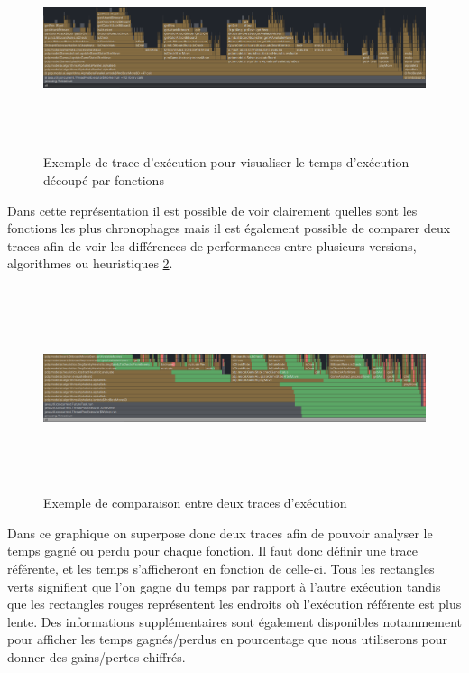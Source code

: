\documentclass{article}
\begin{document}
\begin{figure}[h]
    \centering
    \includegraphics[width=\textwidth,height=6.0cm,keepaspectratio]{trace_example.png}
    \caption{Exemple de trace d'exécution pour visualiser le temps d'exécution découpé par fonctions}
    \label{trace_ex}
\end{figure}

Dans cette représentation il est possible de voir clairement quelles sont les fonctions les plus chronophages mais il est également possible 
de comparer deux traces afin de voir les différences de performances entre plusieurs versions, algorithmes ou heuristiques \ref{trace_ex2}.

\begin{figure}[h]
    \centering
    \includegraphics[width=\textwidth,height=6.0cm,keepaspectratio]{trace_ex2.png}
    \caption{Exemple de comparaison entre deux traces d'exécution}
    \label{trace_ex2}
\end{figure}

Dans ce graphique on superpose donc deux traces afin de pouvoir analyser le temps gagné ou perdu pour chaque fonction. Il faut donc définir une trace référente, et les temps
s'afficheront en fonction de celle-ci. Tous les rectangles verts signifient que l'on gagne du temps par rapport à l'autre exécution tandis que les rectangles rouges représentent
les endroits où l'exécution référente est plus lente. Des informations supplémentaires sont également disponibles notammement pour afficher les temps gagnés/perdus en pourcentage
que nous utiliserons pour donner des gains/pertes chiffrés.
\end{document}
